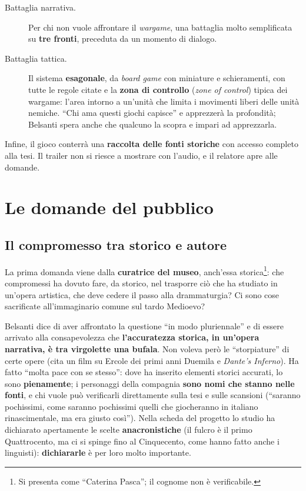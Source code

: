 \begin{description}
  \item[Battaglia narrativa.] Per chi non vuole affrontare il \emph{wargame},
        una battaglia molto semplificata su \textbf{tre fronti}, preceduta da un
        momento di dialogo.
  \item[Battaglia tattica.] Il sistema \textbf{esagonale}, da \emph{board game}
        con miniature e schieramenti, con tutte le regole citate e la
        \textbf{zona di controllo} (\emph{zone of control}) tipica dei wargame:
        l'area intorno a un'unità che limita i movimenti liberi delle unità
        nemiche. ``Chi ama questi giochi capisce'' e apprezzerà la profondità;
        Belsanti spera anche che qualcuno la scopra e impari ad
        apprezzarla.
\end{description}

Infine, il gioco conterrà una \textbf{raccolta delle fonti storiche} con accesso
completo alla tesi. Il trailer non si riesce a mostrare con l'audio, e il relatore
apre alle domande.

\section{Le domande del pubblico}
\label{sec:c1-2-domande}

\subsection{Il compromesso tra storico e autore}

La prima domanda viene dalla \textbf{curatrice del museo}, anch'essa
storica\footnote{Si presenta come ``Caterina Pasca''; il cognome non è
verificabile.}: che compromessi ha dovuto fare, da storico, nel trasporre ciò che
ha studiato in un'opera artistica, che deve cedere il passo alla drammaturgia?
Ci sono cose sacrificate all'immaginario comune sul tardo Medioevo?

Belsanti dice di aver affrontato la questione ``in modo pluriennale'' e di essere
arrivato alla consapevolezza che \textbf{l'accuratezza storica, in un'opera
narrativa, è tra virgolette una bufala}. Non voleva però le ``storpiature'' di
certe opere (cita un film su Ercole dei primi anni Duemila e \emph{Dante's
Inferno}). Ha fatto ``molta pace con se stesso'': dove ha inserito elementi
storici accurati, lo sono \textbf{pienamente}; i personaggi della compagnia
\textbf{sono nomi che stanno nelle fonti}, e chi vuole può verificarli
direttamente sulla tesi e sulle scansioni (``saranno pochissimi, come saranno
pochissimi quelli che giocheranno in italiano rinascimentale, ma era giusto
così''). Nella scheda del progetto lo studio ha dichiarato apertamente le scelte
\textbf{anacronistiche} (il fulcro è il primo Quattrocento, ma ci si spinge fino
al Cinquecento, come hanno fatto anche i linguisti): \textbf{dichiararle} è per
loro molto importante.

